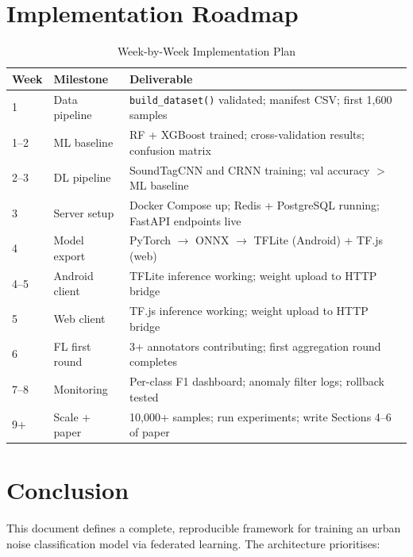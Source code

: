 \documentclass[11pt,a4paper]{article}
\begin{document}
\section{Implementation Roadmap}

\begin{table}[h]
\centering
\caption{Week-by-Week Implementation Plan}
\begin{tabular}{@{}p{2cm}p{3.5cm}p{7cm}@{}}
\toprule
\textbf{Week} & \textbf{Milestone} & \textbf{Deliverable} \\
\midrule
1   & Data pipeline & \texttt{build\_dataset()} validated; manifest CSV; first 1,600 samples \\
1--2 & ML baseline & RF + XGBoost trained; cross-validation results; confusion matrix \\
2--3 & DL pipeline & SoundTagCNN and CRNN training; val accuracy $>$ ML baseline \\
3   & Server setup & Docker Compose up; Redis + PostgreSQL running; FastAPI endpoints live \\
4   & Model export & PyTorch $\to$ ONNX $\to$ TFLite (Android) + TF.js (web) \\
4--5 & Android client & TFLite inference working; weight upload to HTTP bridge \\
5   & Web client & TF.js inference working; weight upload to HTTP bridge \\
6   & FL first round & 3+ annotators contributing; first aggregation round completes \\
7--8 & Monitoring & Per-class F1 dashboard; anomaly filter logs; rollback tested \\
9+  & Scale + paper & 10,000+ samples; run experiments; write Sections 4--6 of paper \\
\bottomrule
\end{tabular}
\end{table}

\section{Conclusion}

This document defines a complete, reproducible framework for training an urban
noise classification model via federated learning. The architecture prioritises:
\end{document}
